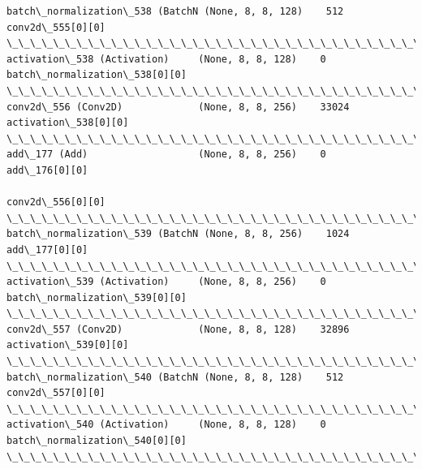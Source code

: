 \documentclass[11pt]{article}
\begin{document}
\begin{Verbatim}[commandchars=\\\{\}]
batch\_normalization\_538 (BatchN (None, 8, 8, 128)    512         conv2d\_555[0][0]                 
\_\_\_\_\_\_\_\_\_\_\_\_\_\_\_\_\_\_\_\_\_\_\_\_\_\_\_\_\_\_\_\_\_\_\_\_\_\_\_\_\_\_\_\_\_\_\_\_\_\_\_\_\_\_\_\_\_\_\_\_\_\_\_\_\_\_\_\_\_\_\_\_\_\_\_\_\_\_\_\_\_\_\_\_\_\_\_\_\_\_\_\_\_\_\_\_\_\_
activation\_538 (Activation)     (None, 8, 8, 128)    0           batch\_normalization\_538[0][0]    
\_\_\_\_\_\_\_\_\_\_\_\_\_\_\_\_\_\_\_\_\_\_\_\_\_\_\_\_\_\_\_\_\_\_\_\_\_\_\_\_\_\_\_\_\_\_\_\_\_\_\_\_\_\_\_\_\_\_\_\_\_\_\_\_\_\_\_\_\_\_\_\_\_\_\_\_\_\_\_\_\_\_\_\_\_\_\_\_\_\_\_\_\_\_\_\_\_\_
conv2d\_556 (Conv2D)             (None, 8, 8, 256)    33024       activation\_538[0][0]             
\_\_\_\_\_\_\_\_\_\_\_\_\_\_\_\_\_\_\_\_\_\_\_\_\_\_\_\_\_\_\_\_\_\_\_\_\_\_\_\_\_\_\_\_\_\_\_\_\_\_\_\_\_\_\_\_\_\_\_\_\_\_\_\_\_\_\_\_\_\_\_\_\_\_\_\_\_\_\_\_\_\_\_\_\_\_\_\_\_\_\_\_\_\_\_\_\_\_
add\_177 (Add)                   (None, 8, 8, 256)    0           add\_176[0][0]                    
                                                                 conv2d\_556[0][0]                 
\_\_\_\_\_\_\_\_\_\_\_\_\_\_\_\_\_\_\_\_\_\_\_\_\_\_\_\_\_\_\_\_\_\_\_\_\_\_\_\_\_\_\_\_\_\_\_\_\_\_\_\_\_\_\_\_\_\_\_\_\_\_\_\_\_\_\_\_\_\_\_\_\_\_\_\_\_\_\_\_\_\_\_\_\_\_\_\_\_\_\_\_\_\_\_\_\_\_
batch\_normalization\_539 (BatchN (None, 8, 8, 256)    1024        add\_177[0][0]                    
\_\_\_\_\_\_\_\_\_\_\_\_\_\_\_\_\_\_\_\_\_\_\_\_\_\_\_\_\_\_\_\_\_\_\_\_\_\_\_\_\_\_\_\_\_\_\_\_\_\_\_\_\_\_\_\_\_\_\_\_\_\_\_\_\_\_\_\_\_\_\_\_\_\_\_\_\_\_\_\_\_\_\_\_\_\_\_\_\_\_\_\_\_\_\_\_\_\_
activation\_539 (Activation)     (None, 8, 8, 256)    0           batch\_normalization\_539[0][0]    
\_\_\_\_\_\_\_\_\_\_\_\_\_\_\_\_\_\_\_\_\_\_\_\_\_\_\_\_\_\_\_\_\_\_\_\_\_\_\_\_\_\_\_\_\_\_\_\_\_\_\_\_\_\_\_\_\_\_\_\_\_\_\_\_\_\_\_\_\_\_\_\_\_\_\_\_\_\_\_\_\_\_\_\_\_\_\_\_\_\_\_\_\_\_\_\_\_\_
conv2d\_557 (Conv2D)             (None, 8, 8, 128)    32896       activation\_539[0][0]             
\_\_\_\_\_\_\_\_\_\_\_\_\_\_\_\_\_\_\_\_\_\_\_\_\_\_\_\_\_\_\_\_\_\_\_\_\_\_\_\_\_\_\_\_\_\_\_\_\_\_\_\_\_\_\_\_\_\_\_\_\_\_\_\_\_\_\_\_\_\_\_\_\_\_\_\_\_\_\_\_\_\_\_\_\_\_\_\_\_\_\_\_\_\_\_\_\_\_
batch\_normalization\_540 (BatchN (None, 8, 8, 128)    512         conv2d\_557[0][0]                 
\_\_\_\_\_\_\_\_\_\_\_\_\_\_\_\_\_\_\_\_\_\_\_\_\_\_\_\_\_\_\_\_\_\_\_\_\_\_\_\_\_\_\_\_\_\_\_\_\_\_\_\_\_\_\_\_\_\_\_\_\_\_\_\_\_\_\_\_\_\_\_\_\_\_\_\_\_\_\_\_\_\_\_\_\_\_\_\_\_\_\_\_\_\_\_\_\_\_
activation\_540 (Activation)     (None, 8, 8, 128)    0           batch\_normalization\_540[0][0]    
\_\_\_\_\_\_\_\_\_\_\_\_\_\_\_\_\_\_\_\_\_\_\_\_\_\_\_\_\_\_\_\_\_\_\_\_\_\_\_\_\_\_\_\_\_\_\_\_\_\_\_\_\_\_\_\_\_\_\_\_\_\_\_\_\_\_\_\_\_\_\_\_\_\_\_\_\_\_\_\_\_\_\_\_\_\_\_\_\_\_\_\_\_\_\_\_\_\_

\end{Verbatim}
\end{document}
